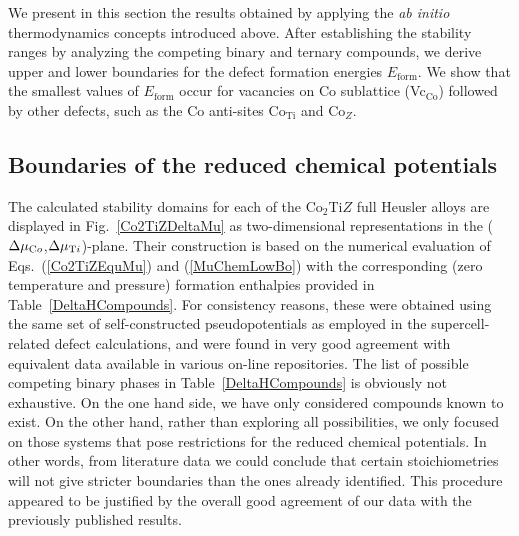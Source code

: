 \documentclass[aps,prb,twocolumn,superscriptaddress,showpacs]{revtex4}
\newcommand{\FG}[1]{Fig.~\ref{#1}}
\begin{document}
We present in this section the results obtained 
by applying the {\em ab initio} thermodynamics concepts
introduced above. After establishing the 
stability ranges by analyzing the competing binary and
ternary compounds, we derive upper and lower boundaries for the 
defect formation energies $E_\text{form}$.
We show that the 
smallest values of $E_\text{form}$ occur for 
vacancies on Co sublattice (Vc$_\text{Co}$)
followed by other defects,
such as the Co anti-sites Co$_\text{Ti}$ and Co$_Z$.

\subsection{Boundaries of the reduced chemical potentials}

The calculated stability domains for each of the
Co$_2$Ti$Z$ full Heusler alloys are displayed in 
\FG{Co2TiZDeltaMu} as two-dimensional representations
in the ($\Delta\mu_{\text Co}$,$\Delta\mu_{\text Ti}$)-plane.
Their construction is based on the numerical evaluation of 
Eqs.~(\ref{Co2TiZEquMu}) and (\ref{MuChemLowBo})
with the corresponding (zero temperature and pressure)
formation enthalpies provided in Table~\ref{DeltaHCompounds}. 
For consistency reasons, these were obtained using 
the same set of self-constructed 
pseudopotentials as employed in the supercell-related 
defect calculations, and were found in 
very good agreement with equivalent data
available in various on-line repositories.\cite{MatProj}
The list of possible competing binary 
phases in Table~\ref{DeltaHCompounds}
is obviously not exhaustive. On the one hand side, we have
only considered compounds known to exist. On the other
hand, rather than exploring all possibilities,
we only focused on those systems
that pose restrictions for the reduced chemical potentials.
In other words, from literature data we could conclude
that certain stoichiometries will not give stricter 
boundaries than the ones already identified. This
procedure appeared to be justified by the overall
good agreement of our data with the previously published
results.
\end{document}
